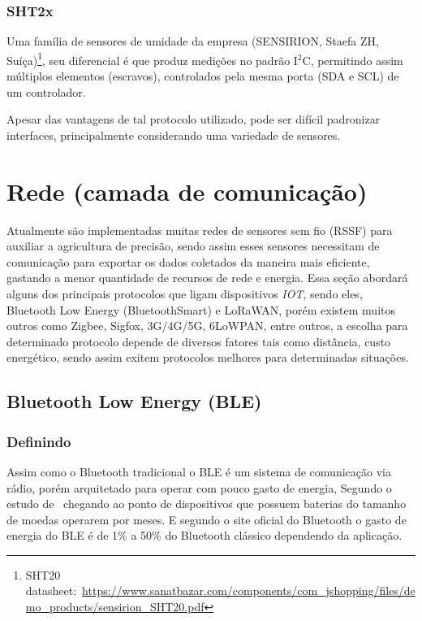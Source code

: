 \documentclass[
article,			%
12pt,				%
oneside,			%
a4paper,			%
english,			%
brazil,				%
sumario=tradicional
]{abntex2}
\begin{document}
\subsubsection{SHT2x}\label{SHT2x}
Uma família de sensores de umidade da empresa (SENSIRION, Staefa ZH, Suíça)\footnote{SHT20 datasheet:~\url{https://www.sanatbazar.com/components/com_jshopping/files/demo_products/sensirion_SHT20.pdf}}, seu diferencial é que produz medições no padrão I$^2$C, permitindo assim múltiplos elementos (escravos), controlados pela mesma porta (SDA e SCL) de um controlador.

Apesar das vantagens de tal protocolo utilizado, pode ser difícil padronizar interfaces\cite{4}, principalmente considerando uma variedade de sensores.

\section{Rede (camada de comunicação)}\label{Rede (camada de comunicação)}

Atualmente são implementadas muitas redes de sensores sem fio (RSSF) para auxiliar a agricultura de precisão\cite{6}, sendo assim esses sensores necessitam de comunicação para exportar os dados coletados da maneira mais eficiente, gastando a menor quantidade de recursos de rede e energia\cite{5}. Essa seção abordará alguns dos principais protocolos que ligam dispositivos \textit{IOT}, sendo eles\cite{5}, Bluetooth Low Energy (BluetoothSmart) e LoRaWAN\texttrademark, porém existem muitos outros como Zigbee, Sigfox, 3G/4G/5G, 6LoWPAN, entre outros, a escolha para determinado protocolo depende de diversos fatores tais como distância, custo energético, sendo assim exitem protocolos melhores para determinadas situações\cite{7}.

\subsection{Bluetooth Low Energy (BLE)}\label{Bluetooth Low Energy (BLE)}
\subsubsection{Definindo}\label{Definindo}
Assim como o Bluetooth tradicional o BLE é um sistema de comunicação via rádio, porém arquitetado para operar com pouco gasto de energia\cite{siteBluetooth}, Segundo o estudo de~\citeauthor{ble} chegando ao ponto de dispositivos que possuem baterias do tamanho de moedas operarem por meses. E segundo o site oficial do Bluetooth\cite{siteBluetooth} o gasto de energia do BLE é de 1\% a 50\% do Bluetooth clássico dependendo da aplicação.
\end{document}
